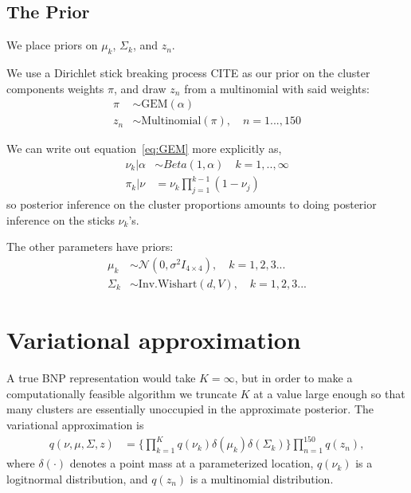 \documentclass[a4paper]{article}
\begin{document}
\subsection{The Prior}
We place priors on $\mu_k$, $\Sigma_k$, and $z_n$. \par

We use a Dirichlet stick breaking process CITE as our prior on the cluster components
weights $\pi$, and draw $z_n$ from a multinomial with said weights:
\begin{align}
	\pi &\sim \text{GEM}(\alpha) \label{eq:GEM} \\
	 z_n &\sim \text{Multinomial}(\pi), \quad n = 1..., 150
\end{align}

We can write out equation~\ref{eq:GEM} more explicitly as,
\begin{align}
  \nu_k | \alpha &\sim Beta(1, \alpha) \quad k = 1, .., \infty \label{eq:beta_sticks}\\
  \pi_k | \nu &= \nu_k \prod_{j=1}^{k-1} (1 - \nu_j) \label{eq:stick_breaking}
\end{align}
so posterior inference on the cluster proportions amounts to doing
posterior inference on the sticks $\nu_k$'s.

The other parameters have priors:
\begin{align}
	\mu_k &\sim \mathcal{N}(0, \sigma^2 I_{4\times 4}), \quad k = 1, 2, 3 ... \\
	\Sigma_k &\sim \text{Inv.Wishart}(d, V), \quad k = 1, 2, 3 ...
\end{align}


\section{Variational approximation}
A true BNP representation would take $K = \infty$, but in order to make a computationally feasible
algorithm we truncate $K$ at a value large enough so that many clusters are essentially unoccupied in
the approximate posterior. The variational approximation is
\begin{align}
q(\nu, \mu, \Sigma, z) & =
\Big\{\prod_{k=1}^{K}q\left(\nu_{k}\right)\delta\left(\mu_{k}\right)\delta\left(\Sigma_{k}\right)\Big\} \prod_{n=1}^{150}q\left(z_{n}\right),
\end{align}
where $\delta\left(\cdot\right)$ denotes a point mass at a parameterized
location, $q\left(\nu_{k}\right)$ is a logitnormal distribution, and $q\left(z_{n}\right)$
is a multinomial distribution.
\end{document}

